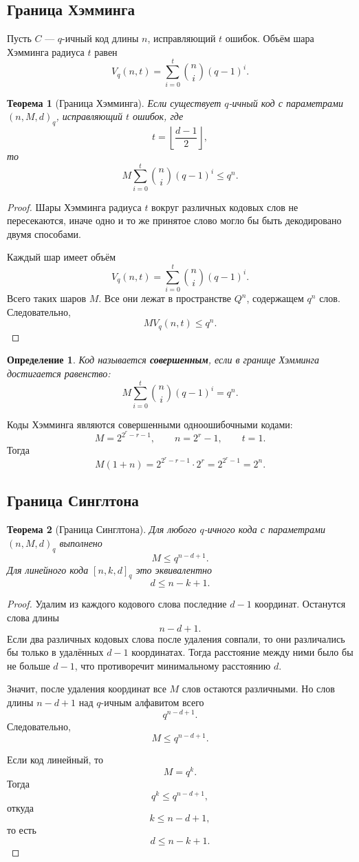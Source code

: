 \documentclass[12pt,a4paper]{article}
\newtheorem{definition}{Определение}[section]
\newtheorem{theorem}{Теорема}[section]
\begin{document}
\subsection{Граница Хэмминга}

Пусть $C$ --- $q$-ичный код длины $n$, исправляющий $t$ ошибок.
Объём шара Хэмминга радиуса $t$ равен
\[
    V_q(n,t)=\sum_{i=0}^{t}\binom{n}{i}(q-1)^i.
\]

\begin{theorem}[Граница Хэмминга]
Если существует $q$-ичный код с параметрами $(n,M,d)_q$, исправляющий $t$ ошибок, где
\[
    t=\left\lfloor\frac{d-1}{2}\right\rfloor,
\]
то
\[
    M\sum_{i=0}^{t}\binom{n}{i}(q-1)^i\le q^n.
\]
\end{theorem}

\begin{proof}
Шары Хэмминга радиуса $t$ вокруг различных кодовых слов не пересекаются, иначе одно и то же принятое слово могло бы быть декодировано двумя способами.

Каждый шар имеет объём
\[
    V_q(n,t)=\sum_{i=0}^{t}\binom{n}{i}(q-1)^i.
\]
Всего таких шаров $M$.
Все они лежат в пространстве $Q^n$, содержащем $q^n$ слов.
Следовательно,
\[
    M V_q(n,t)\le q^n.
\]
\end{proof}

\begin{definition}
Код называется \textbf{совершенным}, если в границе Хэмминга достигается равенство:
\[
    M\sum_{i=0}^{t}\binom{n}{i}(q-1)^i=q^n.
\]
\end{definition}

Коды Хэмминга являются совершенными одноошибочными кодами:
\[
    M=2^{2^r-r-1},\qquad n=2^r-1,\qquad t=1.
\]
Тогда
\[
    M(1+n)=2^{2^r-r-1}\cdot 2^r=2^{2^r-1}=2^n.
\]

\subsection{Граница Синглтона}

\begin{theorem}[Граница Синглтона]
Для любого $q$-ичного кода с параметрами $(n,M,d)_q$ выполнено
\[
    M\le q^{n-d+1}.
\]
Для линейного кода $[n,k,d]_q$ это эквивалентно
\[
    d\le n-k+1.
\]
\end{theorem}

\begin{proof}
Удалим из каждого кодового слова последние $d-1$ координат.
Останутся слова длины
\[
    n-d+1.
\]
Если два различных кодовых слова после удаления совпали, то они различались бы только в удалённых $d-1$ координатах.
Тогда расстояние между ними было бы не больше $d-1$, что противоречит минимальному расстоянию $d$.

Значит, после удаления координат все $M$ слов остаются различными.
Но слов длины $n-d+1$ над $q$-ичным алфавитом всего
\[
    q^{n-d+1}.
\]
Следовательно,
\[
    M\le q^{n-d+1}.
\]

Если код линейный, то
\[
    M=q^k.
\]
Тогда
\[
    q^k\le q^{n-d+1},
\]
откуда
\[
    k\le n-d+1,
\]
то есть
\[
    d\le n-k+1.
\]
\end{proof}
\end{document}
